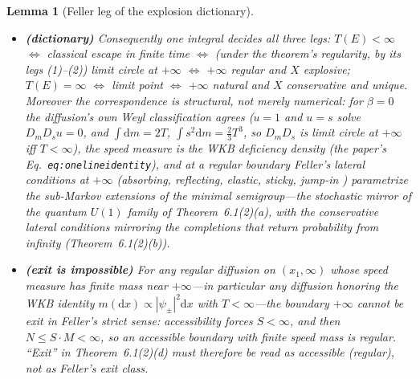 \documentclass[11pt]{article}
\newtheorem{lemma}{Lemma}
\theoremstyle{remark}
\newcommand{\dd}{\mathrm{d}}
\begin{document}
\begin{lemma}[Feller leg of the explosion dictionary]
\begin{itemize}
infinity \cite{Feller1952,Feller1957}.
\item[(iii)] \textbf{(dictionary)}  Consequently one integral decides
all three legs: $T(E)<\infty$ $\Leftrightarrow$ classical escape in
finite time $\Leftrightarrow$ (under the theorem's regularity, by its
legs (1)--(2)) limit circle at $+\infty$ $\Leftrightarrow$ $+\infty$
regular and $X$ explosive; $T(E)=\infty$ $\Leftrightarrow$ limit point
$\Leftrightarrow$ $+\infty$ natural and $X$ conservative and unique.
Moreover the correspondence is structural, not merely numerical: for
$\beta=0$ the diffusion's own Weyl classification agrees ($u=1$ and
$u=s$ solve $D_{m}D_{s}u=0$, and $\int\dd m=2T$,
$\int s^{2}\dd m=\tfrac{2}{3}T^{3}$, so $D_{m}D_{s}$ is limit circle at
$+\infty$ iff $T<\infty$), the speed measure is the WKB deficiency
density (the paper's Eq.~\texttt{eq:onelineidentity}), and at a regular
boundary Feller's lateral conditions at $+\infty$ (absorbing,
reflecting, elastic, sticky, jump-in \cite{Feller1957,ItoMcKean})
parametrize the sub-Markov extensions of the minimal semigroup---the
stochastic mirror of the quantum $U(1)$ family of Theorem~6.1(2)(a),
with the conservative lateral conditions mirroring the completions
that return probability from infinity (Theorem~6.1(2)(b)).
\item[(iv)] \textbf{(exit is impossible)}  For \emph{any} regular
diffusion on $(x_{1},\infty)$ whose speed measure has finite mass near
$+\infty$---in particular any diffusion honoring the WKB identity
$m(\dd x)\propto|\psi_{\pm}|^{2}\dd x$ with $T<\infty$---the boundary
$+\infty$ cannot be exit in Feller's strict sense: accessibility forces
$S<\infty$, and then $N\le S\cdot M<\infty$, so an accessible boundary
with finite speed mass is regular.  ``Exit'' in Theorem~6.1(2)(d) must
therefore be read as \emph{accessible} (regular), not as Feller's
exit class.
\end{itemize}
\end{lemma}
\end{document}
